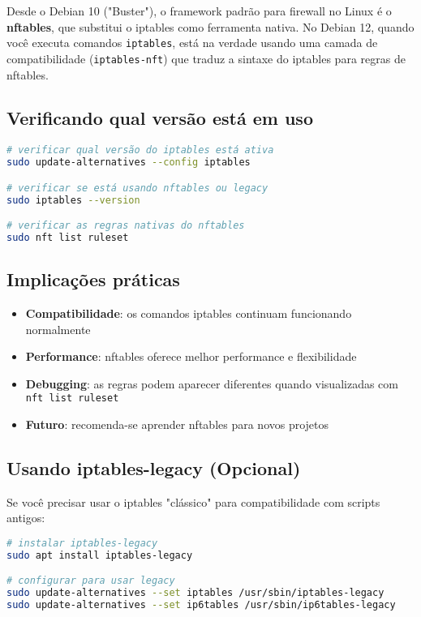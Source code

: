 ﻿\documentclass[12pt,fleqn]{article}
\begin{document}
Desde o Debian 10 ("Buster"), o framework padrão para firewall no Linux é o \textbf{nftables}, que substitui o iptables como ferramenta nativa. No Debian 12, quando você executa comandos \texttt{iptables}, está na verdade usando uma camada de compatibilidade (\texttt{iptables-nft}) que traduz a sintaxe do iptables para regras de nftables.

\subsection{Verificando qual versão está em uso}

\begin{lstlisting}[language=bash, caption=Verificação da versão do iptables]
# verificar qual versão do iptables está ativa
sudo update-alternatives --config iptables

# verificar se está usando nftables ou legacy
sudo iptables --version

# verificar as regras nativas do nftables
sudo nft list ruleset
\end{lstlisting}

\subsection{Implicações práticas}

\begin{itemize}
    \item \textbf{Compatibilidade}: os comandos iptables continuam funcionando normalmente
    \item \textbf{Performance}: nftables oferece melhor performance e flexibilidade
    \item \textbf{Debugging}: as regras podem aparecer diferentes quando visualizadas com \texttt{nft list ruleset}
    \item \textbf{Futuro}: recomenda-se aprender nftables para novos projetos
\end{itemize}

\subsection{Usando iptables-legacy (Opcional)}

Se você precisar usar o iptables "clássico" para compatibilidade com scripts antigos:

\begin{lstlisting}[language=bash, caption=Configuração do iptables-legacy]
# instalar iptables-legacy
sudo apt install iptables-legacy

# configurar para usar legacy
sudo update-alternatives --set iptables /usr/sbin/iptables-legacy
sudo update-alternatives --set ip6tables /usr/sbin/ip6tables-legacy
\end{lstlisting}
\end{document}
